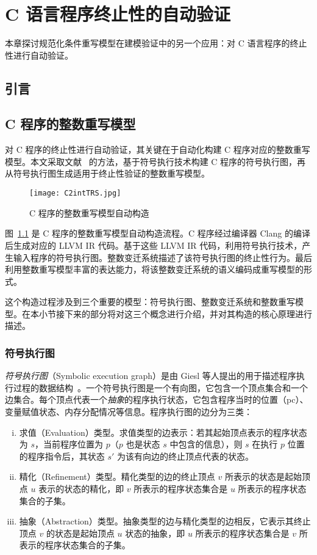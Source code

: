 \chapter{C 语言程序终止性的自动验证}

本章探讨规范化条件重写模型在建模验证中的另一个应用：对 C 语言程序的终止性进行自动验证。

\section{引言}

\section{C 程序的整数重写模型}

对 C 程序的终止性进行自动验证，其关键在于自动化构建 C 程序对应的整数重写模型。本文采取文献~ 的方法，基于符号执行技术构建 C 程序的符号执行图，再从符号执行图生成适用于终止性验证的整数重写模型。

\begin{figure}[ht]
\centering
\texttt{[image: C2intTRS.jpg]}
\caption{C 程序的整数重写模型自动构造}
\label{f:C2intTRS}
\end{figure}

图~\ref{f:C2intTRS} 是 C 程序的整数重写模型自动构造流程。C 程序经过编译器 Clang 的编译后生成对应的 LLVM IR 代码。基于这些 LLVM IR 代码，利用符号执行技术，产生输入程序的符号执行图。整数变迁系统描述了该符号执行图的终止性行为。最后利用整数重写模型丰富的表达能力，将该整数变迁系统的语义编码成重写模型的形式。

这个构造过程涉及到三个重要的模型：符号执行图、整数变迁系统和整数重写模型。在本小节接下来的部分将对这三个概念进行介绍，并对其构造的核心原理进行描述。

\subsection{符号执行图}
\label{ss:seg}

\emph{符号执行图}（Symbolic execution graph）是由 Giesl 等人提出的用于描述程序执行过程的数据结构~\cite{DBLP:conf/lopstr/GieslSSEF12}。一个符号执行图是一个有向图，它包含一个顶点集合和一个边集合。每个顶点代表一个\emph{抽象}的程序执行状态，它包含程序当时的位置（pc）、变量赋值状态、内存分配情况等信息。程序执行图的边分为三类：
\begin{enumerate} [(i)]
\item 求值（Evaluation）类型。求值类型的边表示：若其起始顶点表示的程序状态为 $s$，当前程序位置为 $p$（$p$ 也是状态 $s$ 中包含的信息），则 $s$ 在执行 $p$ 位置的程序指令后，其状态 $s'$ 为该有向边的终止顶点代表的状态。
\item 精化（Refinement）类型。精化类型的边的终止顶点 $v$ 所表示的状态是起始顶点 $u$ 表示的状态的精化，即 $v$ 所表示的程序状态集合是 $u$ 所表示的程序状态集合的子集。
\item 抽象（Abstraction）类型。抽象类型的边与精化类型的边相反，它表示其终止顶点 $v$ 的状态是起始顶点 $u$ 状态的抽象，即 $u$ 所表示的程序状态集合是 $v$ 所表示的程序状态集合的子集。
\end{enumerate}

